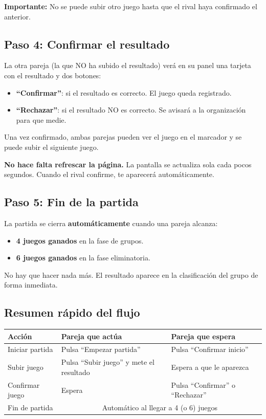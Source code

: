 \documentclass[11pt,a4paper]{article}
\begin{document}
\textbf{Importante:} No se puede subir otro juego hasta que el rival haya confirmado el anterior.

\subsection{Paso 4: Confirmar el resultado}

La otra pareja (la que NO ha subido el resultado) verá en su panel una tarjeta con el resultado y dos botones:

\begin{itemize}
    \item \textbf{``Confirmar''}: si el resultado es correcto. El juego queda registrado.
    \item \textbf{``Rechazar''}: si el resultado NO es correcto. Se avisará a la organización para que medie.
\end{itemize}

Una vez confirmado, ambas parejas pueden ver el juego en el marcador y se puede subir el siguiente juego.

\textbf{No hace falta refrescar la página.} La pantalla se actualiza sola cada pocos segundos. Cuando el rival confirme, te aparecerá automáticamente.

\subsection{Paso 5: Fin de la partida}

La partida se cierra \textbf{automáticamente} cuando una pareja alcanza:
\begin{itemize}
    \item \textbf{4 juegos ganados} en la fase de grupos.
    \item \textbf{6 juegos ganados} en la fase eliminatoria.
\end{itemize}

No hay que hacer nada más. El resultado aparece en la clasificación del grupo de forma inmediata.

\subsection{Resumen rápido del flujo}

\begin{center}
\begin{tabularx}{\textwidth}{lXX}
\toprule
\textbf{Acción} & \textbf{Pareja que actúa} & \textbf{Pareja que espera} \\
\midrule
Iniciar partida & Pulsa ``Empezar partida'' & Pulsa ``Confirmar inicio'' \\
Subir juego & Pulsa ``Subir juego'' y mete el resultado & Espera a que le aparezca \\
Confirmar juego & Espera & Pulsa ``Confirmar'' o ``Rechazar'' \\
Fin de partida & \multicolumn{2}{c}{Automático al llegar a 4 (o 6) juegos} \\
\bottomrule
\end{tabularx}
\end{center}
\end{document}
